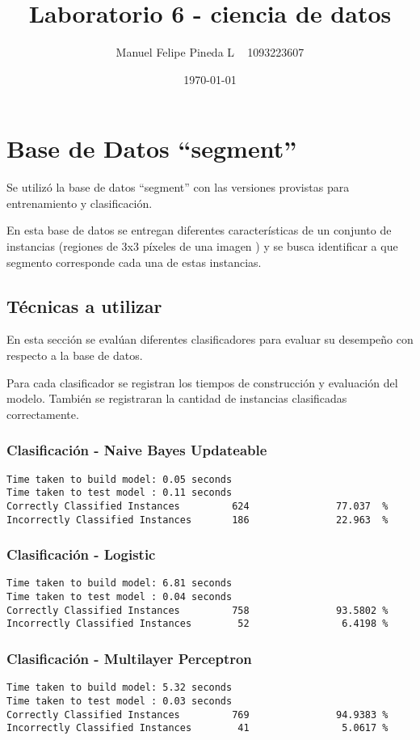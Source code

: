 \documentclass[a4paper]{article}
\title{Laboratorio 6 - ciencia de datos}
\author{Manuel Felipe Pineda L ~ 1093223607}
\date{\today}
\begin{document}
\maketitle

\section{Base de Datos ``segment''}

Se utilizó la base de datos ``segment'' con las versiones
provistas para entrenamiento y clasificación.

En esta base de datos se entregan diferentes características
de un conjunto de instancias (regiones de 3x3 píxeles de una
imagen ) y se busca identificar a que segmento corresponde
cada una de estas instancias.

\subsection{Técnicas a utilizar}
En esta sección se evalúan diferentes clasificadores
para evaluar su desempeño con respecto a la base de datos.

Para cada clasificador se registran los tiempos de construcción
y evaluación del modelo. También se registraran la cantidad
de instancias clasificadas correctamente.

\subsubsection{Clasificación - Naive Bayes Updateable}

\begin{verbatim}
Time taken to build model: 0.05 seconds
Time taken to test model : 0.11 seconds
Correctly Classified Instances         624               77.037  %
Incorrectly Classified Instances       186               22.963  %
\end{verbatim}

\subsubsection{Clasificación - Logistic}
\begin{verbatim}
Time taken to build model: 6.81 seconds
Time taken to test model : 0.04 seconds
Correctly Classified Instances         758               93.5802 %
Incorrectly Classified Instances        52                6.4198 %
\end{verbatim}

\subsubsection{Clasificación - Multilayer Perceptron}
\begin{verbatim}
Time taken to build model: 5.32 seconds
Time taken to test model : 0.03 seconds
Correctly Classified Instances         769               94.9383 %
Incorrectly Classified Instances        41                5.0617 %
\end{verbatim}
\end{document}
